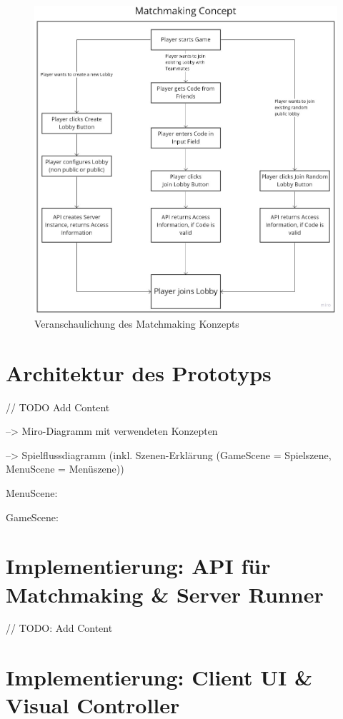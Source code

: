 \begin{figure}
	\centering
	\includegraphics[width=150mm]{images/matchmaking_concept.jpg}
	\caption[Matchmaking-Konzept Diagramm]{Veranschaulichung des Matchmaking Konzepts}
	\label{pic:matchmaking_concept}
\end{figure}


\section{Architektur des Prototyps}
\label{Architektur}

// TODO Add Content

--> Miro-Diagramm mit verwendeten Konzepten

--> Spielflussdiagramm (inkl. Szenen-Erklärung (GameScene = Spielszene, MenuScene = Menüszene))

MenuScene:

GameScene:

\section{Implementierung: API für Matchmaking \& Server Runner}

// TODO: Add Content

\section{Implementierung: Client UI \& Visual Controller}
\label{implementierung:client_UI_Controller}

